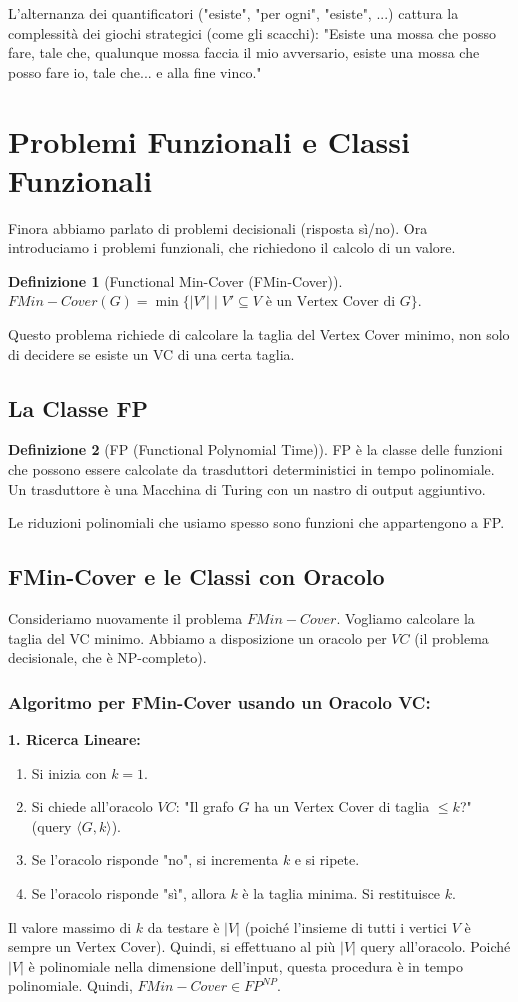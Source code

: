 \documentclass[a4paper]{article}
\theoremstyle{definition} %
\newtheorem{definition}{Definizione}
\begin{document}
L'alternanza dei quantificatori ("esiste", "per ogni", "esiste", ...) cattura la complessità dei giochi strategici (come gli scacchi): "Esiste una mossa che posso fare, tale che, qualunque mossa faccia il mio avversario, esiste una mossa che posso fare io, tale che... e alla fine vinco."

\section{Problemi Funzionali e Classi Funzionali}
Finora abbiamo parlato di problemi decisionali (risposta sì/no). Ora introduciamo i problemi funzionali, che richiedono il calcolo di un valore.

\begin{definition}[Functional Min-Cover (FMin-Cover)]
$FMin-Cover(G) = \min \{ |V'| \mid V' \subseteq V \text{ è un Vertex Cover di } G \}$.
\end{definition}
Questo problema richiede di calcolare la taglia del Vertex Cover minimo, non solo di decidere se esiste un VC di una certa taglia.

\subsection{La Classe FP}
\begin{definition}[FP (Functional Polynomial Time)]
FP è la classe delle funzioni che possono essere calcolate da trasduttori deterministici in tempo polinomiale. Un trasduttore è una Macchina di Turing con un nastro di output aggiuntivo.
\end{definition}
Le riduzioni polinomiali che usiamo spesso sono funzioni che appartengono a FP.

\subsection{FMin-Cover e le Classi con Oracolo}
Consideriamo nuovamente il problema $FMin-Cover$. Vogliamo calcolare la taglia del VC minimo. Abbiamo a disposizione un oracolo per $VC$ (il problema decisionale, che è NP-completo).

\subsubsection{Algoritmo per FMin-Cover usando un Oracolo VC:}
\textbf{1. Ricerca Lineare:}
\begin{enumerate}
    \item Si inizia con $k=1$.
    \item Si chiede all'oracolo $VC$: "Il grafo $G$ ha un Vertex Cover di taglia $\le k$?" (query $\langle G, k \rangle$).
    \item Se l'oracolo risponde "no", si incrementa $k$ e si ripete.
    \item Se l'oracolo risponde "sì", allora $k$ è la taglia minima. Si restituisce $k$.
\end{enumerate}
Il valore massimo di $k$ da testare è $|V|$ (poiché l'insieme di tutti i vertici $V$ è sempre un Vertex Cover). Quindi, si effettuano al più $|V|$ query all'oracolo. Poiché $|V|$ è polinomiale nella dimensione dell'input, questa procedura è in tempo polinomiale.
Quindi, $FMin-Cover \in FP^{NP}$.
\end{document}
